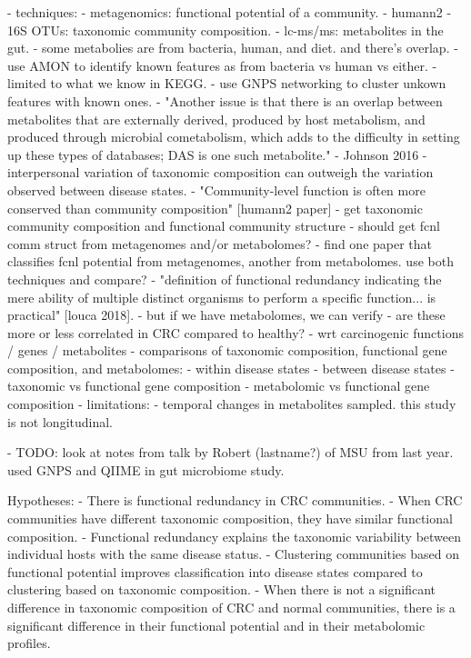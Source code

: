 \documentclass[12pt]{article}
\begin{document}
- techniques:
    - metagenomics: functional potential of a community.
        - humann2
    - 16S OTUs: taxonomic community composition.
    - lc-ms/ms: metabolites in the gut.
        - some metabolies are from bacteria, human, and diet. and there's overlap.
            - use AMON to identify known features as from bacteria vs human vs either.
                - limited to what we know in KEGG.
            - use GNPS networking to cluster unkown features with known ones.
            - "Another issue is that there is an overlap between metabolites that are externally derived, produced by host metabolism, and produced through microbial cometabolism, which adds to the difficulty in setting up these types of databases; DAS is one such metabolite." - Johnson 2016
- interpersonal variation of taxonomic composition can outweigh the variation observed between disease states.
    - "Community-level function is often more conserved than community composition" [humann2 paper]
- get taxonomic community composition and functional community structure
    - should get fcnl comm struct from metagenomes and/or metabolomes?
        - find one paper that classifies fcnl potential from metagenomes, another from metabolomes. use both techniques and compare?
    - "definition of functional redundancy indicating the mere ability of multiple distinct organisms to perform a specific function... is practical" [louca 2018].
        - but if we have metabolomes, we can verify
    - are these more or less correlated in CRC compared to healthy?
        - wrt carcinogenic functions / genes / metabolites
- comparisons of taxonomic composition, functional gene composition, and metabolomes:
    - within disease states
    - between disease states
        - taxonomic vs functional gene composition
        - metabolomic vs functional gene composition
- limitations:
    - temporal changes in metabolites sampled. this study is not longitudinal.

- TODO: look at notes from talk by Robert (lastname?) of MSU from last year. used GNPS and QIIME in gut microbiome study.

Hypotheses:
- There is functional redundancy in CRC communities.
    - When CRC communities have different taxonomic composition, they have similar functional composition.
        - Functional redundancy explains the taxonomic variability between individual hosts with the same disease status.
- Clustering communities based on functional potential improves classification into disease states compared to clustering based on taxonomic composition.
- When there is not a significant difference in taxonomic composition of CRC and normal communities, there is a significant difference in their functional potential and in their metabolomic profiles.
\end{document}
